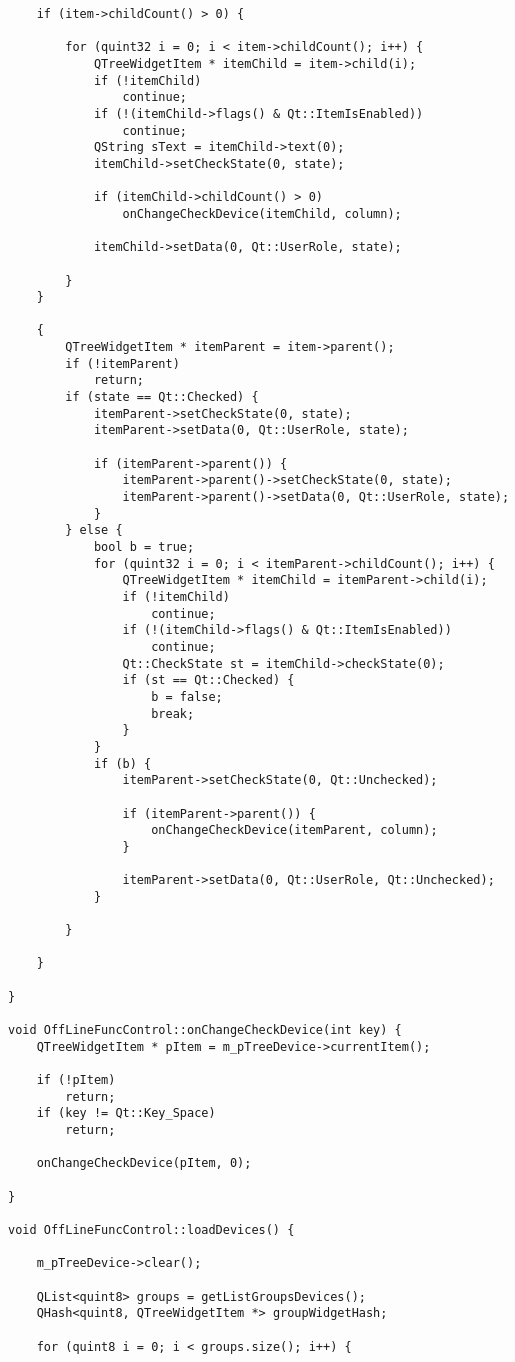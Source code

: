 \begin{verbatim}
	if (item->childCount() > 0) {

		for (quint32 i = 0; i < item->childCount(); i++) {
			QTreeWidgetItem * itemChild = item->child(i);
			if (!itemChild)
				continue;
			if (!(itemChild->flags() & Qt::ItemIsEnabled))
				continue;
			QString sText = itemChild->text(0);
			itemChild->setCheckState(0, state);

			if (itemChild->childCount() > 0)
				onChangeCheckDevice(itemChild, column);

			itemChild->setData(0, Qt::UserRole, state);

		}
	}

	{
		QTreeWidgetItem * itemParent = item->parent();
		if (!itemParent)
			return;
		if (state == Qt::Checked) {
			itemParent->setCheckState(0, state);
			itemParent->setData(0, Qt::UserRole, state);

			if (itemParent->parent()) {
				itemParent->parent()->setCheckState(0, state);
				itemParent->parent()->setData(0, Qt::UserRole, state);
			}
		} else {
			bool b = true;
			for (quint32 i = 0; i < itemParent->childCount(); i++) {
				QTreeWidgetItem * itemChild = itemParent->child(i);
				if (!itemChild)
					continue;
				if (!(itemChild->flags() & Qt::ItemIsEnabled))
					continue;
				Qt::CheckState st = itemChild->checkState(0);
				if (st == Qt::Checked) {
					b = false;
					break;
				}
			}
			if (b) {
				itemParent->setCheckState(0, Qt::Unchecked);

				if (itemParent->parent()) {
					onChangeCheckDevice(itemParent, column);
				}

				itemParent->setData(0, Qt::UserRole, Qt::Unchecked);
			}

		}

	}

}

void OffLineFuncControl::onChangeCheckDevice(int key) {
	QTreeWidgetItem * pItem = m_pTreeDevice->currentItem();

	if (!pItem)
		return;
	if (key != Qt::Key_Space)
		return;

	onChangeCheckDevice(pItem, 0);

}

void OffLineFuncControl::loadDevices() {

	m_pTreeDevice->clear();

	QList<quint8> groups = getListGroupsDevices();
	QHash<quint8, QTreeWidgetItem *> groupWidgetHash;

	for (quint8 i = 0; i < groups.size(); i++) {


\end{verbatim}
